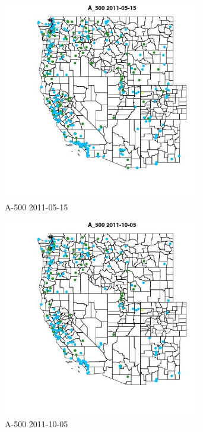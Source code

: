\begin{figure} 
\centering  
\includegraphics[width=0.77\textwidth]{Code_Outputs/ML_input_report_ML_input_PM25_Step5_part_d_de_duplicated_aves_ML_input_MapObsA_5002011-05-15.jpg} 
\caption{\label{fig:ML_input_report_ML_input_PM25_Step5_part_d_de_duplicated_aves_ML_inputMapObsA_5002011-05-15}A-500 2011-05-15} 
\end{figure} 
 

\begin{figure} 
\centering  
\includegraphics[width=0.77\textwidth]{Code_Outputs/ML_input_report_ML_input_PM25_Step5_part_d_de_duplicated_aves_ML_input_MapObsA_5002011-10-05.jpg} 
\caption{\label{fig:ML_input_report_ML_input_PM25_Step5_part_d_de_duplicated_aves_ML_inputMapObsA_5002011-10-05}A-500 2011-10-05} 
\end{figure} 
 


